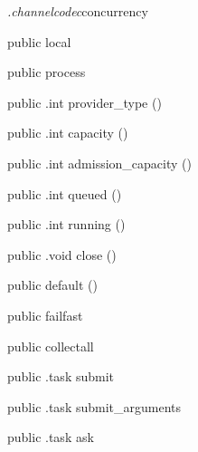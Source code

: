 \begin{CrexxClass}{\textit{.channelcodec}}{concurrency}

  \begin{Hierarchy}
  \end{Hierarchy}

  \begin{Members}

    \Factory
      {public}
      {local}
      {}

    \Factory
      {public}
      {process}
      {}

    \Method
      {public}
      {.int}
      {provider\_type}
      {()}

    \Method
      {public}
      {.int}
      {capacity}
      {()}

    \Method
      {public}
      {.int}
      {admission\_capacity}
      {()}

    \Method
      {public}
      {.int}
      {queued}
      {()}

    \Method
      {public}
      {.int}
      {running}
      {()}

    \Method
      {public}
      {.void}
      {close}
      {()}

    \Factory
      {public}
      {default}
      {()}

    \Factory
      {public}
      {failfast}
      {}

    \Factory
      {public}
      {collectall}
      {}

    \Method
      {public}
      {.task}
      {submit}
      {}

    \Method
      {public}
      {.task}
      {submit\_arguments}
      {}

    \Method
      {public}
      {.task}
      {ask}
      {}


\end{Members}
\end{CrexxClass}
